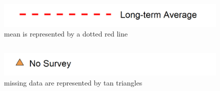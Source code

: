 \documentclass[
]{book}
\begin{document}
\begin{columns-nocenter}

\begin{column}

\begin{figure}
\includegraphics[width=15.25in]{figures/mline} \caption{mean is represented by a dotted red line}\label{fig:unnamed-chunk-83}
\end{figure}

\end{column}

\begin{column}

\begin{figure}
\includegraphics[width=15.25in]{figures/mpoint} \caption{missing data are represented by tan triangles}\label{fig:unnamed-chunk-84}
\end{figure}

\end{column}

\begin{column}

\end{column}

\end{columns-nocenter}
\end{document}
